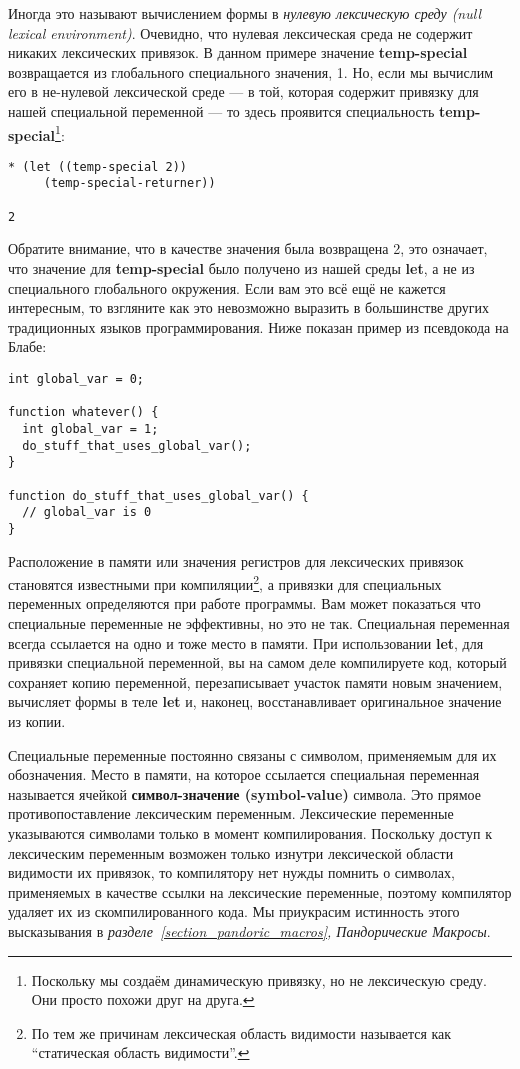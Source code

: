 Иногда это называют вычислением формы в \emph{нулевую лексическую среду (null lexical environment)}. Очевидно, что нулевая лексическая среда не содержит никаких лексических привязок. В данном примере значение \textbf{temp-special} возвращается из глобального специального значения, 1. Но, если мы вычислим его в не-нулевой лексической среде --- в той, которая содержит привязку для нашей специальной переменной --- то здесь проявится специальность \textbf{temp-special}\footnote{Поскольку мы создаём динамическую привязку, но не лексическую среду. Они просто похожи друг на друга.}:

\begin{verbatim}
* (let ((temp-special 2))
     (temp-special-returner))

2
\end{verbatim}

Обратите внимание, что в качестве значения была возвращена 2, это означает, что значение для \textbf{temp-special} было получено из нашей среды \textbf{let}, а не из специального глобального окружения. Если вам это всё ещё не кажется интересным, то взгляните как это невозможно выразить в большинстве других традиционных языков программирования. Ниже показан пример из псевдокода на Блабе:

\begin{verbatim}
int global_var = 0;

function whatever() {
  int global_var = 1;
  do_stuff_that_uses_global_var();
}

function do_stuff_that_uses_global_var() {
  // global_var is 0
}
\end{verbatim}

Расположение в памяти или значения регистров для лексических привязок становятся известными при компиляции\footnote{По тем же причинам лексическая область видимости называется как ``статическая область видимости''.}, а привязки для специальных переменных определяются при работе программы. Вам может показаться что специальные переменные не эффективны, но это не так. Специальная переменная всегда ссылается на одно и тоже место в памяти. При использовании \textbf{let}, для привязки специальной переменной, вы на самом деле компилируете код, который сохраняет копию переменной, перезаписывает участок памяти новым значением, вычисляет формы в теле \textbf{let} и, наконец, восстанавливает оригинальное значение из копии.

Специальные переменные постоянно связаны с символом, применяемым для их обозначения. Место в памяти, на которое ссылается специальная переменная называется ячейкой \textbf{символ-значение (symbol-value)} символа. Это прямое противопоставление лексическим переменным. Лексические переменные указываются символами только в момент компилирования. Поскольку доступ к лексическим переменным возможен только изнутри лексической области видимости их привязок, то компилятору нет нужды помнить о символах, применяемых в качестве ссылки на лексические переменные, поэтому компилятор удаляет их из скомпилированного кода. Мы приукрасим истинность этого высказывания в \emph{разделе~\ref{section_pandoric_macros}, Пандорические Макросы}.

